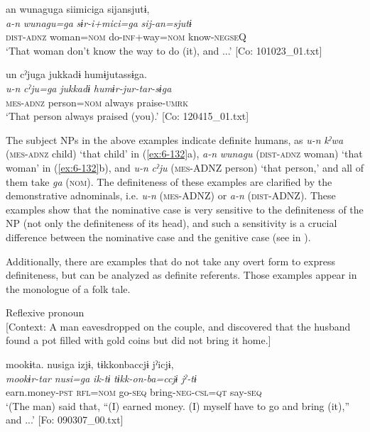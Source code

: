 \begin{styleBeschriftung}
\ex {\TM}  an  wunaguga  siimiciga  sijansjutɨ,\\
\glll \textit{a-n}  \textit{wunagu=ga}  \textit{sɨr-i+mici=ga}  \textit{sij-an=sjutɨ}\\
\textsc{dist}-\textsc{adnz}  woman=\textsc{nom}  do-\textsc{inf}+way=\textsc{nom}  know-\textsc{negseQ}\\
\glt ‘That woman don’t know the way to do (it), and ...’ [Co: 101023\_01.txt]
\z

\ex {\TM}  un  cˀjuga  jukkadɨ  humɨjutassɨga.\\
\glll \textit{u-n}  \textit{cˀju=ga}  \textit{jukkadɨ}  \textit{humɨr-jur-tar-sɨga}\\
\textsc{mes}-\textsc{adnz}  person=\textsc{nom}  always  praise-\textsc{umrk}\\
\glt ‘That person always praised (you).’ [Co: 120415\_01.txt]
\z

The subject NPs in the above examples indicate definite humans, as \textit{u-n} \textit{kˀwa} (\textsc{mes}-\textsc{adnz} child) ‘that child’ in (\ref{ex:6-132}a), \textit{a-n} \textit{wunagu} (\textsc{dist}-\textsc{adnz} woman) ‘that woman’ in (\ref{ex:6-132}b), and \textit{u-n} \textit{cˀju} (\textsc{mes}-ADNZ person) ‘that person,’ and all of them take \textit{ga} (\textsc{nom}). The definiteness of these examples are clarified by the demonstrative adnominals, i.e. \textit{u-n} (\textsc{mes}-ADNZ) or \textit{a-n} (\textsc{dist}-ADNZ). These examples show that the nominative case is very sensitive to the definiteness of the NP (not only the definiteness of its head), and such a sensitivity is a crucial difference between the nominative case and the genitive case (see  in ).

  Additionally, there are examples that do not take any overt form to express definiteness, but can be analyzed as definite referents. Those examples appear in the monologue of a folk tale.

\ea\label{ex:6-133}
 \ea Reflexive pronoun\\{}
[Context: A man eavesdropped on the couple, and discovered that the husband found a pot filled with gold coins but did not bring it home.]

{\TM}
\glll mookɨta.  nusiga  izjɨ,  tɨkkonbaccjɨ  jˀicjɨ,\\
      \textit{mookɨr-tar}  \textit{nusi=ga}  \textit{ik-tɨ}  \textit{tɨkk-on-ba=ccjɨ}  \textit{jˀ-tɨ}\\
      earn.money-\textsc{pst}  \textsc{rfl}=\textsc{nom}  go-\textsc{seq}  bring-\textsc{neg}-\textsc{csl}=\textsc{qt}  say-\textsc{seq}\\
\glt ‘(The man) said that, “(I) earned money. (I) myself have to go and bring (it),” and ...’ [Fo: 090307\_00.txt]
\z


\end{styleBeschriftung}
